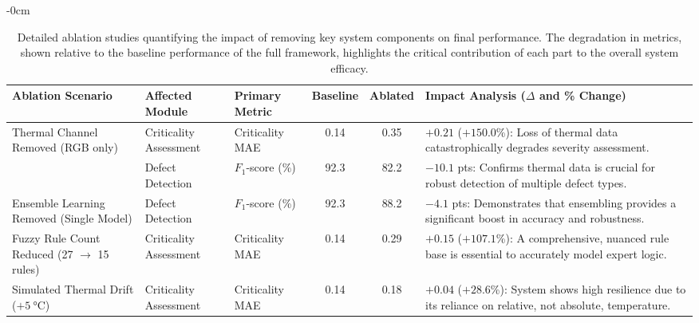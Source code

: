 \documentclass[energies,article,submit,pdftex,moreauthors]{Definitions/mdpi}
\begin{document}
\begin{table}[!htb]
\caption{Detailed ablation studies quantifying the impact of removing key system components on final performance. The degradation in metrics, shown relative to the baseline performance of the full framework, highlights the critical contribution of each part to the overall system efficacy.}
\label{tab:ablation_studies}
\begin{adjustwidth}{-\extralength}{0cm}
\centering
\small
\begin{tabularx}{\linewidth}{l l l c c >{\raggedright\arraybackslash}X}
\toprule
\textbf{Ablation Scenario} & \textbf{Affected Module} & \textbf{Primary Metric} & \textbf{Baseline} & \textbf{Ablated} & \textbf{Impact Analysis (\(\Delta\) and \% Change)} \\
\midrule
\parbox[t]{2.5cm}{Thermal Channel \\ Removed (RGB only)} & Criticality Assessment & Criticality MAE & 0.14 & 0.35 & \(+0.21\) (\(+150.0\)\%): Loss of thermal data catastrophically degrades severity assessment. \\
\cmidrule(l){2-6}
 & Defect Detection & \(F_{1}\)-score (\%) & 92.3 & 82.2 & \(-10.1\) pts: Confirms thermal data is crucial for robust detection of multiple defect types. \\
\midrule
\parbox[t]{2.5cm}{Ensemble Learning \\ Removed (Single Model)} & Defect Detection & \(F_{1}\)-score (\%) & 92.3 & 88.2 & \(-4.1\) pts: Demonstrates that ensembling provides a significant boost in accuracy and robustness. \\
\midrule
\parbox[t]{2.5cm}{Fuzzy Rule Count \\ Reduced (27 \(\to\) 15 rules)} & Criticality Assessment & Criticality MAE & 0.14 & 0.29 & \(+0.15\) (\(+107.1\)\%): A comprehensive, nuanced rule base is essential to accurately model expert logic. \\
\midrule
\parbox[t]{2.5cm}{Simulated Thermal \\ Drift (\(+\SI{5}{\celsius}\))} & Criticality Assessment & Criticality MAE & 0.14 & 0.18 & \(+0.04\) (\(+28.6\)\%): System shows high resilience due to its reliance on relative, not absolute, temperature. \\
\bottomrule
\end{tabularx}
\end{adjustwidth}
\end{table}
\end{document}
